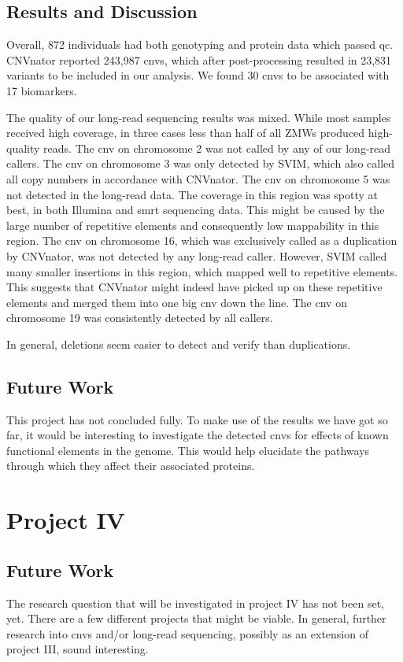 \documentclass[draft]{scrbook}
\begin{document}
\section{Results and Discussion}
Overall, 872 individuals had both genotyping and protein data which passed \gls{qc}.
\textsf{CNVnator} reported 243,987 \glspl{cnv}, which after post-processing resulted in 23,831 variants to be included in our analysis.
We found 30 \glspl{cnv} to be associated with 17 biomarkers.

The quality of our long-read sequencing results was mixed.
While most samples received high coverage, in three cases less than half of all ZMWs produced high-quality reads.
The \gls{cnv} on chromosome 2 was not called by any of our long-read callers.
The \gls{cnv} on chromosome 3 was only detected by \textsf{SVIM}, which also called all copy numbers in accordance with \textsf{CNVnator}.
The \gls{cnv} on chromosome 5 was not detected in the long-read data.
The coverage in this region was spotty at best, in both Illumina and \gls{smrt} sequencing data.
This might be caused by the large number of repetitive elements and consequently low mappability in this region.
The \gls{cnv} on chromosome 16, which was exclusively called as a duplication by \textsf{CNVnator}, was not detected by any long-read caller.
However, \textsf{SVIM} called many smaller insertions in this region, which mapped well to repetitive elements.
This suggests that \textsf{CNVnator} might indeed have picked up on these repetitive elements and merged them into one big \gls{cnv} down the line.
The \gls{cnv} on chromosome 19 was consistently detected by all callers.

In general, deletions seem easier to detect and verify than duplications.

\section{Future Work}
This project has not concluded fully.
To make use of the results we have got so far, it would be interesting to investigate the detected \glspl{cnv} for effects of known functional elements in the genome.
This would help elucidate the pathways through which they affect their associated proteins.

\chapter{Project IV}
\section{Future Work}
The research question that will be investigated in project IV has not been set, yet.
There are a few different projects that might be viable.
In general, further research into \glspl{cnv} and/or long-read sequencing, possibly as an extension of project III, sound interesting.
\end{document}
